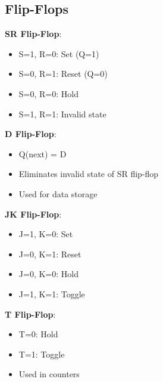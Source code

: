 \documentclass[12pt,a4paper]{report}
\begin{document}
\subsection{Flip-Flops}
\begin{concept}
\textbf{SR Flip-Flop}:
\begin{itemize}
    \item S=1, R=0: Set (Q=1)
    \item S=0, R=1: Reset (Q=0)
    \item S=0, R=0: Hold
    \item S=1, R=1: Invalid state
\end{itemize}

\textbf{D Flip-Flop}:
\begin{itemize}
    \item Q(next) = D
    \item Eliminates invalid state of SR flip-flop
    \item Used for data storage
\end{itemize}

\textbf{JK Flip-Flop}:
\begin{itemize}
    \item J=1, K=0: Set
    \item J=0, K=1: Reset
    \item J=0, K=0: Hold
    \item J=1, K=1: Toggle
\end{itemize}

\textbf{T Flip-Flop}:
\begin{itemize}
    \item T=0: Hold
    \item T=1: Toggle
    \item Used in counters
\end{itemize}
\end{concept}
\end{document}
